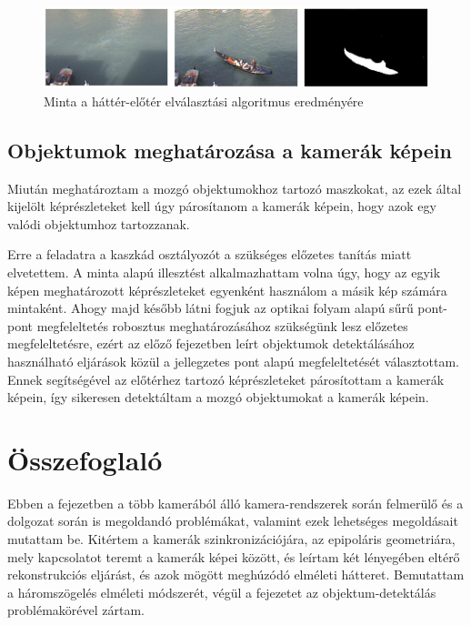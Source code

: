 \begin{figure}[tbh]
\centering
\includegraphics{figures/mog.png}
\caption{Minta a háttér-előtér elválasztási algoritmus eredményére \cite{mog-example} \label{fig:mog-example}}
\end{figure}

\subsection{Objektumok meghatározása a kamerák képein}

Miután meghatároztam a mozgó objektumokhoz tartozó maszkokat, az ezek által kijelölt képrészleteket kell úgy párosítanom a kamerák képein, hogy azok egy valódi objektumhoz tartozzanak.

Erre a feladatra a kaszkád osztályozót a szükséges előzetes tanítás miatt elvetettem. A minta alapú illesztést alkalmazhattam volna úgy, hogy az egyik képen meghatározott képrészleteket egyenként használom a másik kép számára mintaként. Ahogy majd később látni fogjuk az optikai folyam alapú sűrű pont-pont megfeleltetés robosztus meghatározásához szükségünk lesz előzetes megfeleltetésre, ezért az előző fejezetben leírt objektumok detektálásához használható eljárások közül a jellegzetes pont alapú megfeleltetését választottam. Ennek segítségével az előtérhez tartozó képrészleteket párosítottam a kamerák képein, így sikeresen detektáltam a mozgó objektumokat a kamerák képein.

\section{Összefoglaló}

Ebben a fejezetben a több kamerából álló kamera-rendszerek során felmerülő és a dolgozat során is megoldandó problémákat, valamint ezek lehetséges megoldásait mutattam be. Kitértem a kamerák szinkronizációjára, az epipoláris geometriára, mely kapcsolatot teremt a kamerák képei között, és leírtam két lényegében eltérő rekonstrukciós eljárást, és azok mögött meghúzódó elméleti hátteret. Bemutattam a háromszögelés elméleti módszerét, végül a fejezetet az objektum-detektálás problémakörével zártam.
